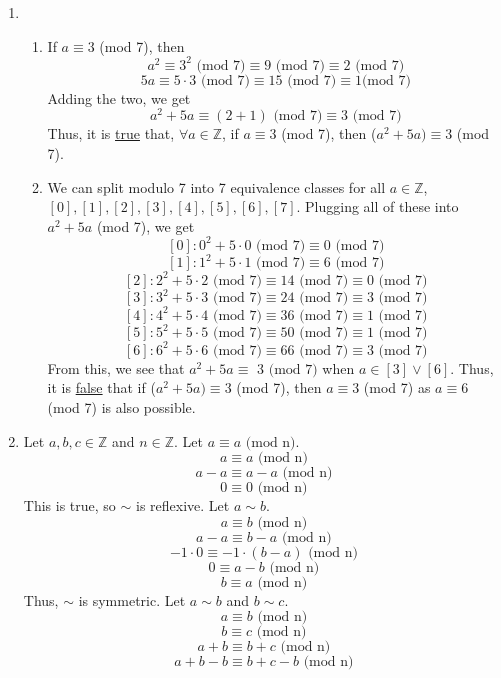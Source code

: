 \documentclass{article}
\begin{document}
\begin{enumerate}[label=\textbf{\arabic*}.]
    \item 
        \begin{enumerate}[label=\textbf{\alph*}.]
            \item If $a \equiv 3$ (mod 7), then
                \[a^2 \equiv 3^2 \text{ (mod 7)} \equiv 9 \text{ (mod 7)} \equiv 2 \text{ (mod 7)}\]
                \[5a \equiv 5\cdot3 \text{ (mod 7)} \equiv 15 \text{ (mod 7)} \equiv 1 \text{(mod 7)}\]
            Adding the two, we get
            \[a^2 + 5a \equiv (2+1) \text{ (mod 7)} \equiv 3 \text{ (mod 7)}\]
            Thus, it is \underline{true} that, $\forall a \in \mathbb{Z}$, if $a \equiv 3$ (mod 7), then ($a^2+5a) \equiv 3$ (mod 7).
            \item We can split modulo 7 into 7 equivalence classes for all $a \in \mathbb{Z}$, $[0],[1],[2],[3],[4],[5],[6],[7]$. Plugging all of these into $a^2+5a$ (mod 7), we get
            \[[0]: 0^2+5\cdot0 \text{ (mod 7)} \equiv 0 \text{ (mod 7)}\]
            \[[1]: 1^2+5\cdot1 \text{ (mod 7)} \equiv 6 \text{ (mod 7)}\]
            \[[2]: 2^2+5\cdot2 \text{ (mod 7)} \equiv 14 \text{ (mod 7)} \equiv 0 \text{ (mod 7)}\]
            \[[3]: 3^2+5\cdot3 \text{ (mod 7)} \equiv 24 \text{ (mod 7)} \equiv 3 \text{ (mod 7)}\]
            \[[4]: 4^2+5\cdot4 \text{ (mod 7)} \equiv 36 \text{ (mod 7)} \equiv 1 \text{ (mod 7)}\]
            \[[5]: 5^2+5\cdot5 \text{ (mod 7)} \equiv 50 \text{ (mod 7)} \equiv 1 \text{ (mod 7)}\]
            \[[6]: 6^2+5\cdot6 \text{ (mod 7)} \equiv 66 \text{ (mod 7)} \equiv 3 \text{ (mod 7)}\]
            From this, we see that $a^2+5a \equiv \text{ 3 (mod 7)}$ when $a \in [3] \lor [6]$. Thus, it is \underline{false} that if ($a^2+5a) \equiv 3$ (mod 7), then $a \equiv 3$ (mod 7) as $a \equiv 6$ (mod 7) is also possible.
        \end{enumerate}
    \item Let $a,b,c\in\mathbb{Z}$ and $n \in\mathbb{Z}$. Let $a\equiv a\text{ (mod n)}$.
    \[a\equiv a\text{ (mod n)}\]
    \[a-a\equiv a-a\text{ (mod n)}\]
    \[0\equiv0\text{ (mod n)}\]
    This is true, so $\sim$ is reflexive. Let $a\sim{b}$.
    \[a\equiv b\text{ (mod n)}\]
    \[a-a\equiv b-a\text{ (mod n)}\]
    \[-1\cdot0\equiv -1\cdot(b-a)\text{ (mod n)}\]
    \[0\equiv a-b\text{ (mod n)}\]
    \[b\equiv a\text{ (mod n)}\]
    Thus, $\sim$ is symmetric. Let $a\sim{b}$ and $b\sim{c}$.
    \[a\equiv b\text{ (mod n)}\]
    \[b\equiv c\text{ (mod n)}\]
    \[a+b\equiv b+c\text{ (mod n)}\]
    \[a+b-b\equiv b+c-b\text{ (mod n)}\]

\end{enumerate}
\end{document}
